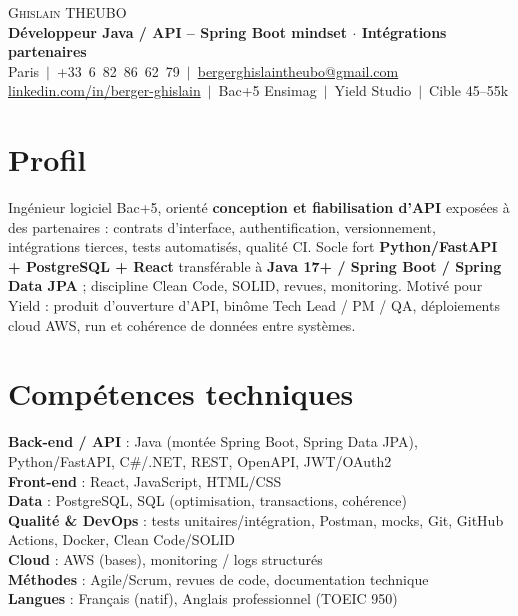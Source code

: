 \documentclass[a4paper,10.5pt]{article}
\begin{document}
\begin{center}
{\Huge \scshape Ghislain THEUBO}\\[2pt]
\textbf{D\'eveloppeur Java / API -- Spring Boot mindset $\cdot$ Int\'egrations partenaires}\\[2pt]
\small Paris $\,|\,$ +33~6~82~86~62~79 $\,|\,$ \href{mailto:bergerghislaintheubo@gmail.com}{bergerghislaintheubo@gmail.com}\\[1pt]
\href{https://www.linkedin.com/in/berger-ghislain}{linkedin.com/in/berger-ghislain} $\,|\,$ Bac+5 Ensimag $\,|\,$ Yield Studio $\,|\,$ Cible 45--55k
\end{center}

\section{Profil}
\small{
Ing\'enieur logiciel Bac+5, orient\'e \textbf{conception et fiabilisation d'API} expos\'ees \`a des partenaires :
contrats d'interface, authentification, versionnement, int\'egrations tierces, tests automatis\'es, qualit\'e CI.
Socle fort \textbf{Python/FastAPI + PostgreSQL + React} transf\'erable \`a \textbf{Java 17+ / Spring Boot / Spring Data JPA} ;
discipline Clean Code, SOLID, revues, monitoring. Motiv\'e pour Yield : produit d'ouverture d'API, bin\^ome
Tech Lead / PM / QA, d\'eploiements cloud AWS, run et coh\'erence de donn\'ees entre syst\`emes.
}

\section{Comp\'etences techniques}
\begin{itemize}[leftmargin=0.08in,label={}]\small{\item{
\textbf{Back-end / API} : Java (mont\'ee Spring Boot, Spring Data JPA), Python/FastAPI, C\#/.NET, REST, OpenAPI, JWT/OAuth2 \\
\textbf{Front-end} : React, JavaScript, HTML/CSS \\
\textbf{Data} : PostgreSQL, SQL (optimisation, transactions, coh\'erence) \\
\textbf{Qualit\'e \& DevOps} : tests unitaires/int\'egration, Postman, mocks, Git, GitHub Actions, Docker, Clean Code/SOLID \\
\textbf{Cloud} : AWS (bases), monitoring / logs structur\'es \\
\textbf{M\'ethodes} : Agile/Scrum, revues de code, documentation technique \\
\textbf{Langues} : Fran\c{c}ais (natif), Anglais professionnel (TOEIC 950)
}}\end{itemize}
\end{document}
